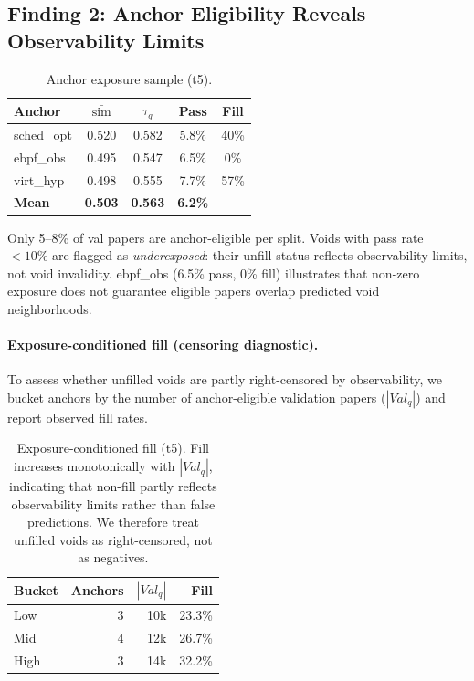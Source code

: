 \documentclass[11pt,twocolumn]{article}
\newcommand{\tauanchor}{\tau_{q}}
\begin{document}
\subsection{Finding 2: Anchor Eligibility Reveals Observability Limits}

\begin{table}[h!]
\centering\small
\caption{Anchor exposure sample (t5).}
\begin{tabular}{lcccc}
\toprule
Anchor & $\bar{\mathrm{sim}}$ & $\tauanchor$ & Pass & Fill \\
\midrule
sched\_opt & 0.520 & 0.582 & 5.8\% & 40\% \\
ebpf\_obs  & 0.495 & 0.547 & 6.5\% & 0\%  \\
virt\_hyp  & 0.498 & 0.555 & 7.7\% & 57\% \\
\textbf{Mean} & \textbf{0.503} & \textbf{0.563} & \textbf{6.2\%} & -- \\
\bottomrule
\end{tabular}
\end{table}

Only 5--8\% of val papers are anchor-eligible per split. Voids with pass rate $<10\%$
are flagged as \emph{underexposed}: their unfill status reflects observability limits,
not void invalidity. ebpf\_obs (6.5\% pass, 0\% fill) illustrates that non-zero
exposure does not guarantee eligible papers overlap predicted void neighborhoods.

\paragraph{Exposure-conditioned fill (censoring diagnostic).}
To assess whether unfilled voids are partly right-censored by observability, we
bucket anchors by the number of anchor-eligible validation papers ($|Val_q|$) and
report observed fill rates.

\begin{table}[h!]
\centering\small
\caption{Exposure-conditioned fill (t5). Fill increases monotonically with $|Val_q|$,
indicating that non-fill partly reflects observability limits rather than false
predictions. We therefore treat unfilled voids as right-censored, not as negatives.}
\begin{tabular}{lrrr}
\toprule
Bucket & Anchors & $|Val_q|$ & Fill \\
\midrule
Low  & 3 & 10k & 23.3\% \\
Mid  & 4 & 12k & 26.7\% \\
High & 3 & 14k & 32.2\% \\
\bottomrule
\end{tabular}
\end{table}
\end{document}
